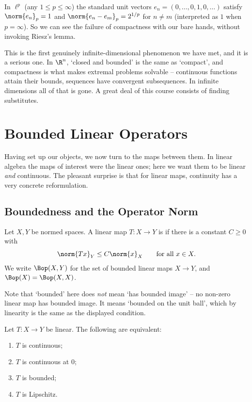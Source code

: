 \begin{example}
	In $\ell^p$ (any $1 \leq p \leq \infty$) the standard unit vectors $e_n = (0, \dots, 0, 1, 0, \dots)$ satisfy $\norm{e_n}_p = 1$ and $\norm{e_n - e_m}_p = 2^{1/p}$ for $n \neq m$ (interpreted as $1$ when $p = \infty$). So we can see the failure of compactness with our bare hands, without invoking Riesz's lemma.
\end{example}

This is the first genuinely infinite-dimensional phenomenon we have met, and it is a serious one. In $\R^n$, `closed and bounded' is the same as `compact', and compactness is what makes extremal problems solvable -- continuous functions attain their bounds, sequences have convergent subsequences. In infinite dimensions all of that is gone. A great deal of this course consists of finding substitutes.

\section{Bounded Linear Operators}

Having set up our objects, we now turn to the maps between them. In linear algebra the maps of interest were the linear ones; here we want them to be linear \emph{and} continuous. The pleasant surprise is that for linear maps, continuity has a very concrete reformulation.

\subsection{Boundedness and the Operator Norm}

\begin{definition}
	Let $X, Y$ be normed spaces. A linear map $T : X \to Y$ is  if there is a constant $C \geq 0$ with
	$$\norm{Tx}_Y \leq C \norm{x}_X \qquad \text{for all } x \in X.$$
	We write $\Bop(X,Y)$ for the set of bounded linear maps $X \to Y$, and $\Bop(X) = \Bop(X,X)$.
\end{definition}

Note that `bounded' here does \emph{not} mean `has bounded image' -- no non-zero linear map has bounded image. It means `bounded on the unit ball', which by linearity is the same as the displayed condition.

\begin{proposition}
	Let $T : X \to Y$ be linear. The following are equivalent:
	\begin{enumerate}[label=(\roman*)]
		\item $T$ is continuous;
		\item $T$ is continuous at $0$;
		\item $T$ is bounded;
		\item $T$ is Lipschitz.
	\end{enumerate}
\end{proposition}

